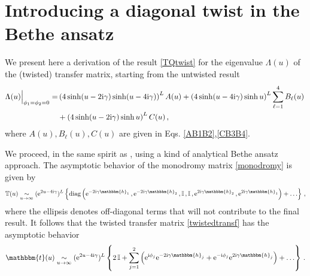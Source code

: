 \documentclass[12pt]{article}
\numberwithin{equation}{section}
\newcommand{\ri}{{\rm i}}
\newcommand{\re}{{\rm e}}
\newcommand{\id}{\mathbb{I}}
\begin{document}
	\section{Introducing a diagonal twist in the Bethe ansatz}\label{sec:twistBA}
	
	We present here a derivation of the
	result \eqref{TQtwist} for the eigenvalue $\Lambda(u)$ of the (twisted) transfer matrix, starting from the untwisted result \cite{Resh87}
	\begin{equation}
		\begin{aligned}
			\Lambda(u)\Big\vert_{\phi_1=\phi_2=0} =& \left(4\sinh(u-2\ri\gamma)\sinh(u-4\ri\gamma)\right)^{L} A(u)
			+ \left(4 \sinh(u-4\ri\gamma) \sinh u\right)^L \sum_{\ell=1}^4 B_\ell(u)\,\\
			&+ \left(4\sinh(u-2\ri\gamma)\sinh u\right)^{L} C(u) \,,
		\end{aligned}
		\label{TQ}
	\end{equation}
	where $A(u), B_{\ell}(u), C(u)$ are given in Eqs. \eqref{AB1B2},\eqref{CB3B4}.
	
	We proceed, in the same spirit as \cite{Resh87},
	using a kind of analytical Bethe ansatz approach. The asymptotic behavior of the monodromy matrix \eqref{monodromy} is given by
	\begin{equation}
		\mathbb{T}(u)\underset{u\rightarrow \infty}{\sim}  (\re^{2u-4\ri\gamma})^L \left\{ \text{diag}\left( \re^{-2\ri\gamma \mathbbm{h}_1}\,, \re^{-2\ri\gamma \mathbbm{h}_2} \,, \id \,, \id \,, \re^{2\ri\gamma \mathbbm{h}_2} \,, \re^{2\ri\gamma \mathbbm{h}_1}\right) + \ldots \right\}\,,
	\end{equation}
	where the ellipsis denotes off-diagonal terms that will not contribute to the final result.
	It follows that the twisted transfer matrix \eqref{twistedtransf} has the asymptotic behavior 
	\begin{equation}
		\mathbbm{t}(u)\underset{u\rightarrow \infty}{\sim}  (\re^{2u-4\ri\gamma})^L \left\{ 
		2\, \id + \sum_{j=1}^2 \left( \re^{\ri \phi_j} \re^{-2\ri\gamma \mathbbm{h}_j} + \re^{-\ri \phi_j} \re^{2\ri\gamma \mathbbm{h}_j} \right) + \ldots \right\} \,.
		\label{transfasym}
	\end{equation}
	
\end{document}
